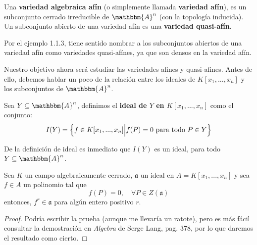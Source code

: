 \documentclass[12pt]{report}
\newcounter{it}
\theoremstyle{largebreak}
\newcommand{\bbm}[1]{\ensuremath{\mathbbm{#1}}}
\newcommand{\fk}[1]{\ensuremath{\mathfrak{#1}}}
\begin{document}
    \begin{mydef}
        Una \textbf{variedad algebraica afín} (o simplemente llamada \textbf{variedad afín}), es un subconjunto cerrado irreducible de $\bbm{A}^n$ (con la topología inducida). Un subconjunto abierto de una variedad afín es una \textbf{variedad quasi-afín}.
    \end{mydef}

    Por el ejemplo 1.1.3, tiene sentido nombrar a los subconjuntos abiertos de una variedad afín como variedades quasi-afínes, ya que son densos en la variedad afín.

    Nuestro objetivo ahora será estudiar las variedades afines y quasi-afines. Antes de ello, debemos hablar un poco de la relación entre los ideales de $K[x_1,...,x_n]$ y los subconjuntos de $\bbm{A}^n$.

    \begin{mydef}
        Sea $Y\subseteq\bbm{A}^n$, definimos el \textbf{ideal de $Y$ en $K[x_1,...,x_n]$} como el conjunto:
        \begin{equation*}
            I(Y)=\left\{f\in K[x_1,...,x_n]\Big|f(P)=0\textup{ para todo }P\in Y \right\}
        \end{equation*}
    \end{mydef}

    De la definición de ideal es inmediato que $I(Y)$ es un ideal, para todo $Y\subseteq\bbm{A}^n$.

    \begin{theor}
        Sea $K$ un campo algebraicamente cerrado, $\fk{a}$ un ideal en $A=K[x_1,...,x_n]$ y sea $f\in A$ un polinomio tal que
        \begin{equation*}
            f(P)=0,\quad\forall P\in Z(\fk{a})
        \end{equation*}
        entonces, $f^r\in\fk{a}$ para algún entero positivo $r$.
    \end{theor}

    \begin{proof}
        Podría escribir la prueba (aunque me llevaría un ratote), pero es más fácil consultar la demostración en \textit{Algebra} de Serge Lang, pag. 378, por lo que daremos el resultado como cierto.
    \end{proof}
\end{document}
